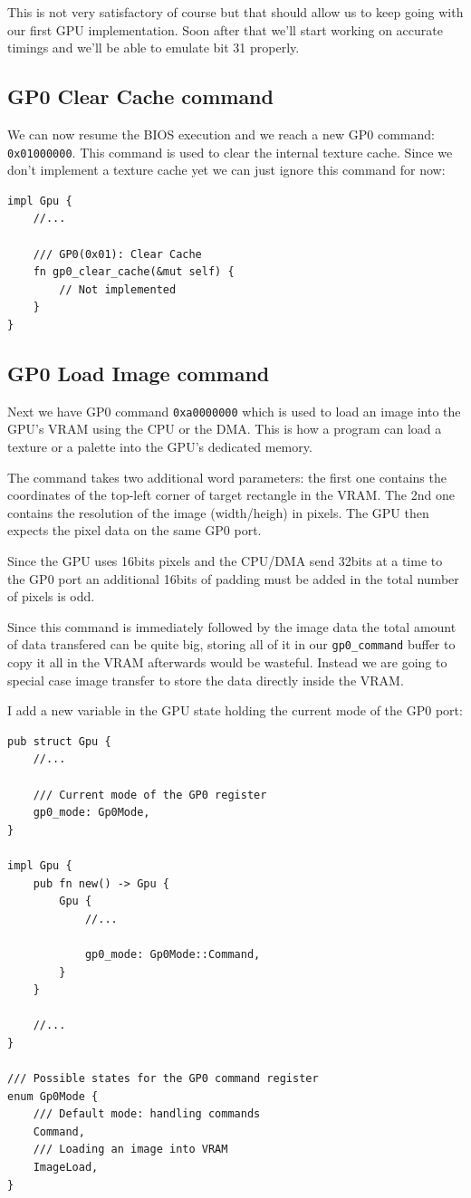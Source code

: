 \documentclass[a4paper]{article}
\newcommand{\code}[1] {\texttt{#1}}
\begin{document}
This is not very satisfactory of course but that should allow us to
keep going with our first GPU implementation. Soon after that we'll
start working on accurate timings and we'll be able to emulate bit 31
properly.

\subsection{GP0 Clear Cache command}

We can now resume the BIOS execution and we reach a new GP0 command:
\code{0x01000000}. This command is used to clear the internal texture
cache. Since we don't implement a texture cache yet we can just ignore
this command for now:

\begin{lstlisting}
impl Gpu {
    //...

    /// GP0(0x01): Clear Cache
    fn gp0_clear_cache(&mut self) {
        // Not implemented
    }
}
\end{lstlisting}

\subsection{GP0 Load Image command}

Next we have GP0 command \code{0xa0000000} which is used to load an
image into the GPU's VRAM using the CPU or the DMA. This is how a
program can load a texture or a palette into the GPU's dedicated
memory.

The command takes two additional word parameters: the first one
contains the coordinates of the top-left corner of target rectangle in
the VRAM. The 2nd one contains the resolution of the image
(width/heigh) in pixels. The GPU then expects the pixel data on the
same GP0 port.

Since the GPU uses 16bits pixels and the CPU/DMA send 32bits at a time
to the GP0 port an additional 16bits of padding must be added in the
total number of pixels is odd.

Since this command is immediately followed by the image data the total
amount of data transfered can be quite big, storing all of it in our
\code{gp0\_command} buffer to copy it all in the VRAM afterwards would
be wasteful. Instead we are going to special case image transfer to
store the data directly inside the VRAM.

I add a new variable in the GPU state holding the current mode of the
GP0 port:

\begin{lstlisting}
pub struct Gpu {
    //...

    /// Current mode of the GP0 register
    gp0_mode: Gp0Mode,
}

impl Gpu {
    pub fn new() -> Gpu {
        Gpu {
            //...

            gp0_mode: Gp0Mode::Command,
        }
    }

    //...
}

/// Possible states for the GP0 command register
enum Gp0Mode {
    /// Default mode: handling commands
    Command,
    /// Loading an image into VRAM
    ImageLoad,
}
\end{lstlisting}
\end{document}
